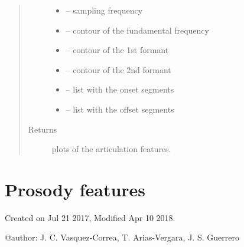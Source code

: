\documentclass[letterpaper,10pt,english]{sphinxmanual}
\let\sphinxpxdimen\pdfpxdimen\else\newdimen\sphinxpxdimen
\begin{document}
\begin{fulllineitems}
\begin{fulllineitems}
\begin{quote}
\begin{description}
\begin{itemize}
\item {} 
 -- sampling frequency

\item {} 
 -- contour of the fundamental frequency

\item {} 
 -- contour of the 1st formant

\item {} 
 -- contour of the 2nd formant

\item {} 
 -- list with the onset segments

\item {} 
 -- list with the offset segments

\end{itemize}

\item[{Returns}] \leavevmode
plots of the articulation features.

\end{description}\end{quote}

\end{fulllineitems}


\end{fulllineitems}



\chapter{Prosody features}
\label{\detokenize{Prosody::doc}}\label{\detokenize{Prosody:prosody-features}}
\noindent\sphinxincludegraphics[width=400\sphinxpxdimen]{{prosody1}.png}
\label{\detokenize{Prosody:module-prosody}}
Created on Jul 21 2017, Modified Apr 10 2018.

@author: J. C. Vasquez-Correa, T. Arias-Vergara, J. S. Guerrero
\end{document}

